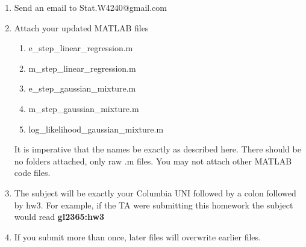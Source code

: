 \documentclass[12pt]{article}
\begin{document}
\begin{enumerate}
	\item Send an email to Stat.W4240@gmail.com
	\item {Attach your updated MATLAB files 
		\begin{enumerate}
			\item e\_step\_linear\_regression.m
			\item m\_step\_linear\_regression.m
			\item e\_step\_gaussian\_mixture.m
			\item m\_step\_gaussian\_mixture.m
			\item  log\_likelihood\_gaussian\_mixture.m
		\end{enumerate} It is imperative that the names be exactly as described here. There should be no folders attached, only raw .m files.  You may not attach other MATLAB code files. }
	\item The subject will be exactly your Columbia UNI followed by a colon followed by hw3.  For example, if the TA were submitting this homework the subject would read {\bf gl2365:hw3}
	\item If you submit more than once, later files will overwrite earlier files.
\end{enumerate}


\problemsdone
\end{document}
